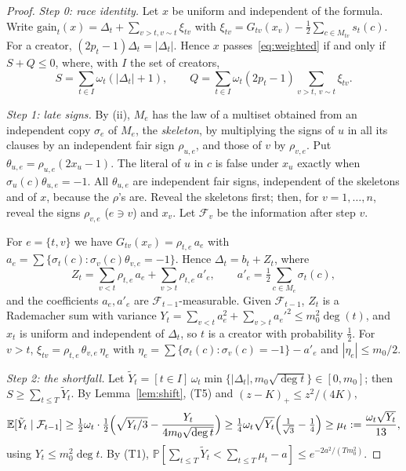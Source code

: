 \documentclass[11pt,a4paper]{article}
\theoremstyle{definition}
\theoremstyle{remark}
\newcommand{\E}{\mathbb E}
\newcommand{\Prb}{\mathbb P}
\begin{document}
\begin{proof}
\emph{Step 0: race identity.} Let $x$ be uniform and independent of the formula.
Write $\mathrm{gain}_t(x)=\Delta_t+\sum_{v>t,v\sim t}\xi_{tv}$ with
$\xi_{tv}=G_{tv}(x_v)-\frac12\sum_{c\in M_{tv}}s_t(c)$. For a creator,
$(2p_t-1)\Delta_t=|\Delta_t|$. Hence $x$ passes~\eqref{eq:weighted} if and only if
$S+Q\le0$, where, with $I$ the set of creators,
\[
 S=\sum_{t\in I}\omega_t(|\Delta_t|+1),\qquad
 Q=\sum_{t\in I}\omega_t(2p_t-1)\sum_{v>t,\,v\sim t}\xi_{tv}.
\]

\emph{Step 1: late signs.} By (ii), $M_e$ has the law of a multiset obtained from
an independent copy $\sigma_e$ of $M_e$, the \emph{skeleton}, by multiplying the
signs of $u$ in all its clauses by an independent fair sign $\rho_{u,e}$, and
those of $v$ by $\rho_{v,e}$. Put $\theta_{u,e}=\rho_{u,e}(2x_u-1)$. The literal of
$u$ in $c$ is false under $x_u$ exactly when $\sigma_u(c)\theta_{u,e}=-1$. All
$\theta_{u,e}$ are independent fair signs, independent of the skeletons and of
$x$, because the $\rho$'s are. Reveal the skeletons first; then, for
$v=1,\dots,n$, reveal the signs $\rho_{v,e}$ ($e\ni v$) and $x_v$. Let
$\mathcal F_v$ be the information after step $v$.

For $e=\{t,v\}$ we have $G_{tv}(x_v)=\rho_{t,e}\,a_e$ with
$a_e=\sum\{\sigma_t(c):\sigma_v(c)\theta_{v,e}=-1\}$. Hence
$\Delta_t=b_t+Z_t$, where
\[
 Z_t=\sum_{v<t}\rho_{t,e}\,a_e+\sum_{v>t}\rho_{t,e}\,a'_e,\qquad
 a'_e=\tfrac12\textstyle\sum_{c\in M_e}\sigma_t(c),
\]
and the coefficients $a_e,a'_e$ are $\mathcal F_{t-1}$-measurable. Given
$\mathcal F_{t-1}$, $Z_t$ is a Rademacher sum with variance
$Y_t=\sum_{v<t}a_e^2+\sum_{v>t}a_e'^2\le m_0^2\deg(t)$, and $x_t$ is uniform and
independent of $\Delta_t$, so $t$ is a creator with probability $\frac12$. For
$v>t$, $\xi_{tv}=\rho_{t,e}\,\theta_{v,e}\,\eta_e$ with
$\eta_e=\sum\{\sigma_t(c):\sigma_v(c)=-1\}-a'_e$ and $|\eta_e|\le m_0/2$.

\emph{Step 2: the shortfall.} Let
$\tilde Y_t=[t\in I]\,\omega_t\min\{|\Delta_t|,m_0\sqrt{\deg t}\}\in[0,m_0]$; then
$S\ge\sum_{t\le T}\tilde Y_t$. By Lemma~\ref{lem:shift}, (T5) and
$(z-K)_+\le z^2/(4K)$,
\[
 \E[\tilde Y_t\mid\mathcal F_{t-1}]
 \ge\tfrac12\omega_t\cdot\tfrac12\Bigl(\sqrt{Y_t/3}-\frac{Y_t}{4m_0\sqrt{\deg t}}\Bigr)
 \ge\tfrac14\omega_t\sqrt{Y_t}\Bigl(\tfrac1{\sqrt3}-\tfrac14\Bigr)
 \ge\mu_t:=\frac{\omega_t\sqrt{Y_t}}{13},
\]
using $Y_t\le m_0^2\deg t$. By (T1),
$\Prb[\sum_{t\le T}\tilde Y_t<\sum_{t\le T}\mu_t-a]\le e^{-2a^2/(Tm_0^2)}$.


\end{proof}
\end{document}
